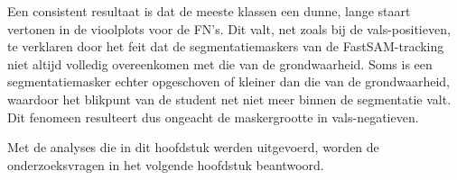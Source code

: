 Een consistent resultaat is dat de meeste klassen een dunne, lange staart vertonen in de vioolplots voor de FN's. 
Dit valt, net zoals bij de vals-positieven, te verklaren door het feit dat de segmentatiemaskers van de FastSAM-tracking niet altijd volledig overeenkomen met die van de grondwaarheid.
Soms is een segmentatiemasker echter opgeschoven of kleiner dan die van de grondwaarheid, waardoor het blikpunt van de student net niet meer binnen de segmentatie valt.
Dit fenomeen resulteert dus ongeacht de maskergrootte in vals-negatieven.

Met de analyses die in dit hoofdstuk werden uitgevoerd, worden de onderzoeksvragen in het volgende hoofdstuk beantwoord.
